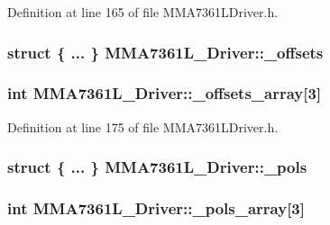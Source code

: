 \-Definition at line 165 of file \-M\-M\-A7361\-L\-Driver.\-h.

\hypertarget{class_m_m_a7361_l___driver_a687f7f21e9ce4c75a341380b086252a2}{
\subsubsection[{\-\_\-offsets}]{\setlength{\rightskip}{0pt plus 5cm}struct \{ ... \}  {\bf \-M\-M\-A7361\-L\-\_\-\-Driver\-::\-\_\-offsets}}}\label{class_m_m_a7361_l___driver_a687f7f21e9ce4c75a341380b086252a2}
\hypertarget{class_m_m_a7361_l___driver_a2aca17da00232bb66ee3cd9cb8c74b78}{
\subsubsection[{\-\_\-offsets\-\_\-array}]{\setlength{\rightskip}{0pt plus 5cm}int {\bf \-M\-M\-A7361\-L\-\_\-\-Driver\-::\-\_\-offsets\-\_\-array}\mbox{[}3\mbox{]}}}\label{class_m_m_a7361_l___driver_a2aca17da00232bb66ee3cd9cb8c74b78}


\-Definition at line 175 of file \-M\-M\-A7361\-L\-Driver.\-h.

\hypertarget{class_m_m_a7361_l___driver_a93e3dcfc8887bc62e209f42ae824388a}{
\subsubsection[{\-\_\-pols}]{\setlength{\rightskip}{0pt plus 5cm}struct \{ ... \}  {\bf \-M\-M\-A7361\-L\-\_\-\-Driver\-::\-\_\-pols}}}\label{class_m_m_a7361_l___driver_a93e3dcfc8887bc62e209f42ae824388a}
\hypertarget{class_m_m_a7361_l___driver_a520769579ca5c7b9279ac60b5377b502}{
\subsubsection[{\-\_\-pols\-\_\-array}]{\setlength{\rightskip}{0pt plus 5cm}int {\bf \-M\-M\-A7361\-L\-\_\-\-Driver\-::\-\_\-pols\-\_\-array}\mbox{[}3\mbox{]}}}\label{class_m_m_a7361_l___driver_a520769579ca5c7b9279ac60b5377b502}


